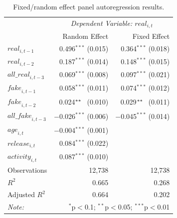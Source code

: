 \begin{table}
    \small
    \centering
    \caption{Fixed/random effect panel autoregression results.}
    \begin{tabular}{lrr} 
    \toprule
     & \multicolumn{2}{c}{\textit{Dependent Variable: $real_{i,t}$}} \\
     & Random Effect & Fixed Effect \\
    \midrule 
     $\textit{real}_{i, t - 1}$ & 0.496$^{***}$ (0.015) & 0.364$^{***}$  (0.018)\\ 
     $\textit{real}_{i, t - 2}$ & 0.187$^{***}$ (0.014) & 0.148$^{***}$  (0.015)\\ 
     $\textit{all\_real}_{i, t - 3}$ & 0.069$^{***}$ (0.008) & 0.097$^{***}$ (0.021)\\ 
     $\textit{fake}_{i, t - 1}$ & 0.058$^{***}$ (0.011) & 0.074$^{***}$ (0.012) \\ 
     $\textit{fake}_{i, t -  2}$ & 0.024$^{**\textcolor{white}{*}}$ (0.010) & 0.029$^{**\textcolor{white}{*}}$ (0.011) \\ 
     $\textit{all\_fake}_{i, t - 3}$ & $-$0.026$^{***}$ (0.006) & $-$0.045$^{***}$ (0.014) \\ 
     $\textit{age}_{i,t}$ & $-$0.004$^{***}$ (0.001)  &  \\ 
     $\textit{release}_{i,t}$ & 0.084$^{***}$  (0.022) &  \\ 
     $\textit{activity}_{i,t}$ & 0.087$^{***}$ (0.010) &  \\ 
    \midrule
    Observations & 12,738 & 12,738 \\ 
    $R^{2}$ & 0.665 & 0.268 \\ 
    Adjusted $R^{2}$ & 0.664 & 0.202 \\ 
    \bottomrule
    \textit{Note:}  & \multicolumn{2}{r}{$^{*}$p$<$0.1; $^{**}$p$<$0.05; $^{***}$p$<$0.01} \\ 
    \end{tabular} 
    \label{tab:regression}
\end{table}

